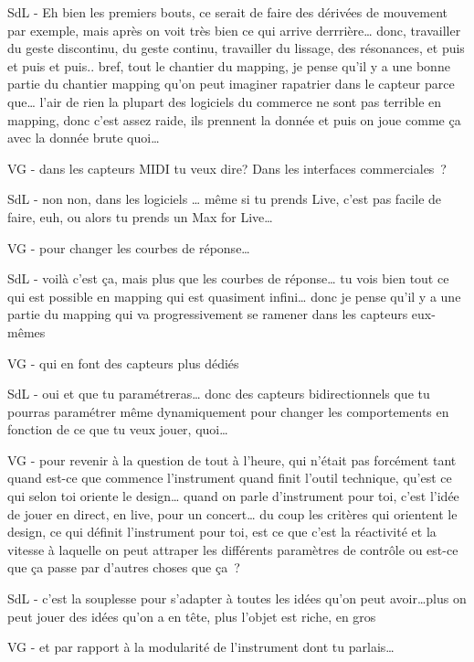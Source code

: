 SdL - Eh bien les premiers bouts, ce serait de faire des dérivées de mouvement par exemple, mais après on voit très bien ce qui arrive derrrière… donc, travailler du geste discontinu, du geste continu, travailler du lissage, des résonances, et puis et puis et puis.. bref, tout le chantier du mapping, je pense qu'il y a une bonne partie du chantier mapping qu'on peut imaginer rapatrier dans le capteur parce que… l'air de rien la plupart des logiciels du commerce ne sont pas terrible en mapping, donc c'est assez raide, ils prennent la donnée et puis on joue comme ça avec la donnée brute quoi… 

VG - dans les capteurs MIDI tu veux dire? Dans les interfaces commerciales ? 

SdL - non non, dans les logiciels … même si tu prends Live, c'est pas facile de faire, euh, ou alors tu prends un Max for Live… 

VG - pour changer les courbes de réponse… 

SdL - voilà c'est ça, mais plus que les courbes de réponse… tu vois bien tout ce qui est possible en mapping qui est quasiment infini… donc je pense qu'il y a une partie du mapping qui va progressivement se ramener dans les capteurs eux-mêmes 

VG - qui en font des capteurs plus dédiés 

SdL - oui et que tu paramétreras… donc des capteurs bidirectionnels que tu pourras paramétrer même dynamiquement pour changer les comportements en fonction de ce que tu veux jouer, quoi… 

VG - pour revenir à la question de tout à l'heure, qui n'était pas forcément tant quand est-ce que commence l'instrument quand finit l'outil technique, qu'est ce qui selon toi oriente le design… quand on parle d'instrument pour toi, c'est l'idée de jouer en direct, en live, pour un concert… du coup les critères qui orientent le design, ce qui définit l'instrument pour toi, est ce que c'est la réactivité et la vitesse à laquelle on peut attraper les différents paramètres de contrôle ou est-ce que ça passe par d'autres choses que ça ? 

SdL - c'est la souplesse pour s'adapter à toutes les idées qu'on peut avoir…plus on peut jouer des idées qu'on a en tête, plus l'objet est riche, en gros 

VG - et par rapport à la modularité de l'instrument dont tu parlais… 

